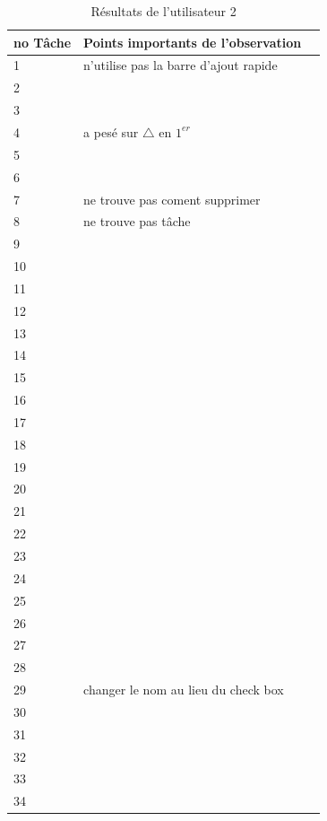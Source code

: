 \documentclass[letterpaper, oneside, 12pt, these, creativecommons]{thETS}
\begin{document}
\newpage

\begin{table}
	\centering
	\begin{tabular}{|l|l|l|}
	\hline
	no Tâche	& Points importants de l'observation	\\ \hline
	1		& n'utilise pas la barre d'ajout rapide	\\ \hline
	2		& 						\\ \hline
	3		& 						\\ \hline
	4		& a pesé sur	$\bigtriangleup$ en $1^{er}$ \\ \hline
	5		& 						\\ \hline
	6		& 						\\ \hline
	7		& ne trouve pas coment supprimer	\\ \hline
	8		& ne trouve pas tâche			\\ \hline
	9		& 						\\ \hline
	10		& 						\\ \hline
	11		& 						\\ \hline
	12		& 						\\ \hline
	13		& 						\\ \hline
	14		& 						\\ \hline
	15		& 						\\ \hline
	16		& 						\\ \hline
	17		& 						\\ \hline
	18		& 						\\ \hline
	19		& 						\\ \hline
	20		& 						\\ \hline
	21		& 						\\ \hline
	22		& 						\\ \hline
	23		& 						\\ \hline
	24		& 						\\ \hline
	25		& 						\\ \hline
	26		& 						\\ \hline
	27		& 						\\ \hline
	28		& 						\\ \hline
	29		& changer le nom au lieu du check box	\\ \hline
	30		& 						\\ \hline
	31		& 						\\ \hline
	32		& 						\\ \hline
	33		& 						\\ \hline
	34		& 						\\ \hline
	\end{tabular}
	\caption{Résultats de l'utilisateur 2}
\end{table}
\end{document}
